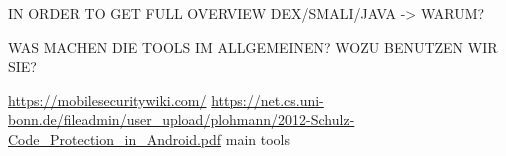 IN ORDER TO GET FULL OVERVIEW DEX/SMALI/JAVA -> WARUM?\newline

WAS MACHEN DIE TOOLS IM ALLGEMEINEN? WOZU BENUTZEN WIR SIE?\newline

\url{https://mobilesecuritywiki.com/}\newline
\url{https://net.cs.uni-bonn.de/fileadmin/user_upload/plohmann/2012-Schulz-Code_Protection_in_Android.pdf}\newline
main tools\newline
